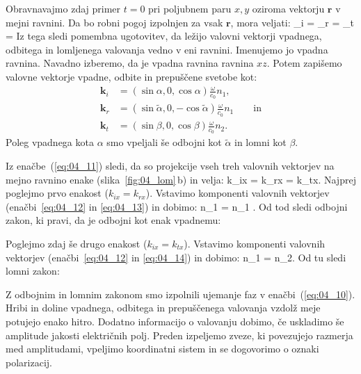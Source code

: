 Obravnavajmo zdaj primer $t=0$ pri poljubnem paru $x,y$ oziroma vektorju $\mathbf{r}$
v mejni ravnini. Da bo robni pogoj izpolnjen za vsak $\mathbf{r}$,
mora veljati:
\beq
{}_i\cdot {} = _r\cdot {} = 
_t\cdot {} = 
\label{eq:04_11}
\eeq
Iz tega sledi pomembna ugotovitev, da ležijo valovni vektorji vpadnega, odbitega
in lomljenega valovanja vedno v eni ravnini. Imenujemo jo vpadna ravnina. 
Navadno izberemo, da je vpadna ravnina ravnina $xz$. Potem zapišemo 
valovne vektorje vpadne, odbite in prepuščene svetobe kot:
\begin{align}
\mathbf{k}_i  &= \left( \sin\alpha, 0, \cos \alpha\right) \frac{\omega}{c_0} n_1, \label{eq:04_12}\\
\mathbf{k}_r  &= \left( \sin\tilde{\alpha}, 0, -\cos \tilde{\alpha}\right) 
\frac{\omega}{c_0} n_1\label{eq:04_13} \qquad \mathrm{in}\\
\mathbf{k}_t  &= \left( \sin\beta, 0, \cos \beta\right) \frac{\omega}{c_0} n_2.\label{eq:04_14}
\end{align}
Poleg vpadnega kota $\alpha$ smo vpeljali še odbojni kot $\tilde{\alpha}$ in lomni
kot $\beta$. 

Iz enačbe~(\ref{eq:04_11}) sledi, da so projekcije vseh treh valovnih vektorjev na mejno
ravnino enake (slika~\ref{fig:04_lom}\,b) in velja:
\beq
k_{ix} = k_{rx} = k_{tx}.
\label{eq:04_15}
\eeq
Najprej poglejmo prvo enakost ($k_{ix} = k_{rx}$). Vstavimo komponenti valovnih
vektorjev (enačbi~\ref{eq:04_12} in \ref{eq:04_13}) in dobimo:
\beq
{} n_1 \sin \alpha  =   n_1 \sin\tilde{\alpha}.
\label{eq:04_16}
\eeq
Od tod sledi odbojni zakon, ki pravi, da je odbojni kot enak vpadnemu:

Poglejmo zdaj še drugo enakost ($k_{ix} = k_{tx}$). Vstavimo komponenti
valovnih vektorjev (enačbi~\ref{eq:04_12} in \ref{eq:04_14}) in dobimo:
\beq
{} n_1 \sin \alpha  =  n_2\sin\beta.
\label{eq:04_17}
\eeq
Od tu sledi lomni zakon:

Z odbojnim in lomnim zakonom smo izpolnili ujemanje faz v enačbi~(\ref{eq:04_10}). 
Hribi in doline vpadnega, odbitega in prepuščenega valovanja vzdolž meje 
potujejo enako hitro. Dodatno informacijo o valovanju dobimo, če
uskladimo še amplitude jakosti električnih polj. Preden izpeljemo
zveze, ki povezujejo razmerja med amplitudami, vpeljimo koordinatni sistem
in se dogovorimo o oznaki polarizacij.

